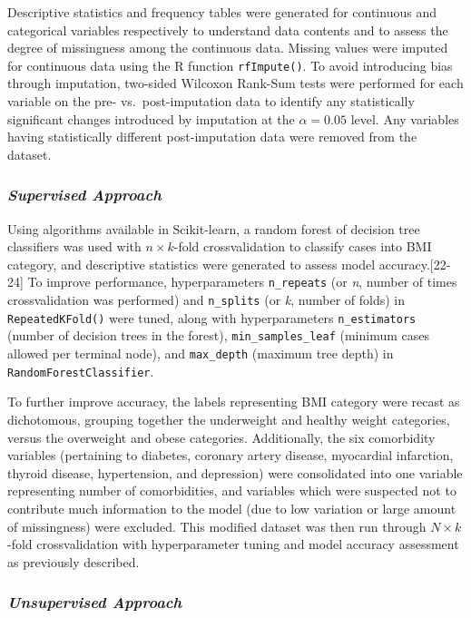 \documentclass[]{article}
\begin{document}
Descriptive statistics and frequency tables were generated for
continuous and categorical variables respectively to understand data
contents and to assess the degree of missingness among the continuous
data. Missing values were imputed for continuous data using the R
function \texttt{rfImpute()}. To avoid introducing bias through
imputation, two-sided Wilcoxon Rank-Sum tests were performed for each
variable on the pre- vs.~post-imputation data to identify any
statistically significant changes introduced by imputation at the
\(\alpha = 0.05\) level. Any variables having statistically different
post-imputation data were removed from the dataset.

\hypertarget{supervised-approach}{%
\subsubsection{\texorpdfstring{\emph{Supervised
Approach}}{Supervised Approach}}\label{supervised-approach}}

Using algorithms available in Scikit-learn, a random forest of decision
tree classifiers was used with \(n \times k\)-fold crossvalidation to
classify cases into BMI category, and descriptive statistics were
generated to assess model accuracy.{[}22-24{]} To improve performance,
hyperparameters \texttt{n\_repeats} (or \emph{n}, number of times
crossvalidation was performed) and \texttt{n\_splits} (or \emph{k},
number of folds) in \texttt{RepeatedKFold()} were tuned, along with
hyperparameters \texttt{n\_estimators} (number of decision trees in the
forest), \texttt{min\_samples\_leaf} (minimum cases allowed per terminal
node), and \texttt{max\_depth} (maximum tree depth) in
\texttt{RandomForestClassifier}.

To further improve accuracy, the labels representing BMI category were
recast as dichotomous, grouping together the underweight and healthy
weight categories, versus the overweight and obese categories.
Additionally, the six comorbidity variables (pertaining to diabetes,
coronary artery disease, myocardial infarction, thyroid disease,
hypertension, and depression) were consolidated into one variable
representing number of comorbidities, and variables which were suspected
not to contribute much information to the model (due to low variation or
large amount of missingness) were excluded. This modified dataset was
then run through \(N \times k\)-fold crossvalidation with hyperparameter
tuning and model accuracy assessment as previously described.

\hypertarget{unsupervised-approach}{%
\subsubsection{\texorpdfstring{\emph{Unsupervised
Approach}}{Unsupervised Approach}}\label{unsupervised-approach}}
\end{document}
